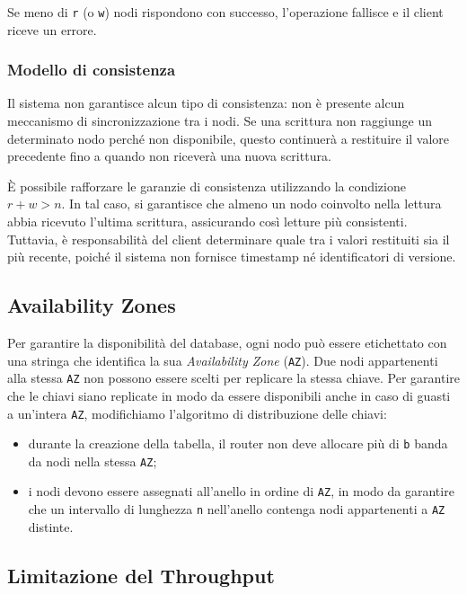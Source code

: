 Se meno di \texttt{r} (o \texttt{w}) nodi rispondono con successo, l'operazione fallisce e il client riceve un errore.

\subsubsection{Modello di consistenza}
\label{subsubsec:modello-consistenza}

Il sistema non garantisce alcun tipo di consistenza: non è presente alcun meccanismo di sincronizzazione tra i nodi. Se una scrittura non raggiunge un determinato nodo perché non disponibile, questo continuerà a restituire il valore precedente fino a quando non riceverà una nuova scrittura.

È possibile rafforzare le garanzie di consistenza utilizzando la condizione $r + w > n$. In tal caso, si garantisce che almeno un nodo coinvolto nella lettura abbia ricevuto l'ultima scrittura, assicurando così letture più consistenti. Tuttavia, è responsabilità del client determinare quale tra i valori restituiti sia il più recente, poiché il sistema non fornisce timestamp né identificatori di versione.

\subsection{Availability Zones}
\label{subsec:availability-zones}

Per garantire la disponibilità del database, ogni nodo può essere etichettato con una stringa che identifica la sua \emph{Availability Zone} (\texttt{AZ}).
Due nodi appartenenti alla stessa \texttt{AZ} non possono essere scelti per replicare la stessa chiave.
Per garantire che le chiavi siano replicate in modo da essere disponibili anche in caso di guasti a un'intera \texttt{AZ}, modifichiamo l'algoritmo di distribuzione delle chiavi:
\begin{itemize}
    \item durante la creazione della tabella, il router non deve allocare più di \texttt{b} banda da nodi nella stessa \texttt{AZ};
    \item i nodi devono essere assegnati all'anello in ordine di \texttt{AZ}, in modo da garantire che un intervallo di lunghezza \texttt{n} nell'anello contenga nodi appartenenti a \texttt{AZ} distinte.
\end{itemize}

\subsection{Limitazione del Throughput}
\label{subsec:limitazione-throughput}

